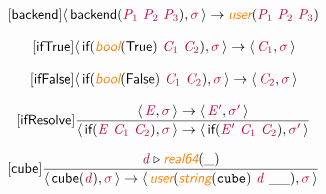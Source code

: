 \documentclass[10pt,leqno,fleqn]{article}
\newcommand{\artVariable}[1]{\mbox{\color{purple}\em #1\/}}
\newcommand{\artConstructor}[1]{\mbox{\sf #1}}
\newcommand{\artCaseInsensitiveLiteral}[1]{\mbox{\tt #1}}
\newcommand{\artSpecial}[1]{\mbox{\color{orange}\sf\em #1}}
\begin{document}
\begin{equation}
\tag*{[\artConstructor{\sf backend}]}
\begin{split}\langle\, \artConstructor{\sf backend}(\artVariable{P$_{1}$}\ \artVariable{P$_{2}$}\ \artVariable{P$_{3}$}), \artVariable{$\sigma$}\,\rangle \rightarrow \artSpecial{user}(\artVariable{P$_{1}$}\ \artVariable{P$_{2}$}\ \artVariable{P$_{3}$})
\end{split}
\end{equation}

\begin{equation}
\tag*{[\artConstructor{\sf ifTrue}]}
\begin{split}\langle\, \artConstructor{\sf if}(\artSpecial{bool}(\artConstructor{\sf True})\ \artVariable{C$_{1}$}\ \artVariable{C$_{2}$}), \artVariable{$\sigma$}\,\rangle \rightarrow \langle\, \artVariable{C$_{1}$}, \artVariable{$\sigma$}\,\rangle 
\end{split}
\end{equation}

\begin{equation}
\tag*{[\artConstructor{\sf ifFalse}]}
\begin{split}\langle\, \artConstructor{\sf if}(\artSpecial{bool}(\artConstructor{\sf False})\ \artVariable{C$_{1}$}\ \artVariable{C$_{2}$}), \artVariable{$\sigma$}\,\rangle \rightarrow \langle\, \artVariable{C$_{2}$}, \artVariable{$\sigma$}\,\rangle 
\end{split}
\end{equation}

\begin{equation}
\tag*{[\artConstructor{\sf ifResolve}]}
\begin{split}\frac{\langle\, \artVariable{E}, \artVariable{$\sigma$}\,\rangle \rightarrow \langle\, \artVariable{E\/$^\prime$}, \artVariable{$\sigma$\/$^\prime$}\,\rangle }{\langle\, \artConstructor{\sf if}(\artVariable{E}\ \artVariable{C$_{1}$}\ \artVariable{C$_{2}$}), \artVariable{$\sigma$}\,\rangle \rightarrow \langle\, \artConstructor{\sf if}(\artVariable{E\/$^\prime$}\ \artVariable{C$_{1}$}\ \artVariable{C$_{2}$}), \artVariable{$\sigma$\/$^\prime$}\,\rangle }
\end{split}
\end{equation}

\begin{equation}
\tag*{[\artConstructor{\sf cube}]}
\begin{split}\frac{ \artVariable{d}\triangleright \artSpecial{real64}(\_) }{\langle\, \artConstructor{\sf cube}(\artVariable{d}), \artVariable{$\sigma$}\,\rangle \rightarrow \langle\, \artSpecial{user}(\artSpecial{string}(\artCaseInsensitiveLiteral{cube})\ \artVariable{d}\ \_\_), \artVariable{$\sigma$}\,\rangle }
\end{split}
\end{equation}
\end{document}
